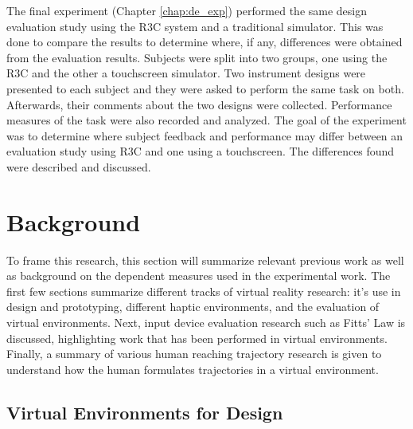 The final experiment (Chapter \ref{chap:de_exp}) performed the same design evaluation study using the R3C system and a traditional simulator.
This was done to compare the results to determine where, if any, differences were obtained from the evaluation results.
Subjects were split into two groups, one using the R3C and the other a touchscreen simulator.
Two instrument designs were presented to each subject and they were asked to perform the same task on both.
Afterwards, their comments about the two designs were collected.
Performance measures of the task were also recorded and analyzed.
The goal of the experiment was to determine where subject feedback and performance may differ between an evaluation study using R3C and one using a touchscreen.
The differences found were described and discussed.


\section{Background}

To frame this research, this section will summarize relevant previous work as well as background on the dependent measures used in the experimental work.
The first few sections summarize different tracks of virtual reality research: it's use in design and prototyping, different haptic environments, and the evaluation of virtual environments.
Next, input device evaluation research such as Fitts' Law is discussed, highlighting work that has been performed in virtual environments.
Finally, a summary of various human reaching trajectory research is given to understand how the human formulates trajectories in a virtual environment.

\subsection{Virtual Environments for Design}

